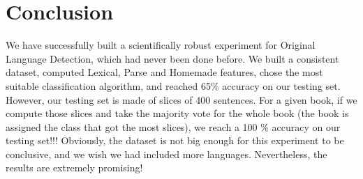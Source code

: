\documentclass[10pt]{article}
\begin{document}
\section{Conclusion}
We have successfully built a scientifically robust experiment for Original Language Detection, which had never been done before. We built a consistent dataset, computed Lexical, Parse and Homemade features, chose the most suitable classification algorithm, and reached 65\% accuracy on our testing set. However, our testing set is made of slices of 400 sentences. For a given book, if we compute those slices and take the majority vote for the whole book (the book is assigned the class that got the most slices), we reach a 100 \% accuracy on our testing set!!! Obviously, the dataset is not big enough for this experiment to be conclusive, and we wish we had included more languages. Nevertheless, the results are extremely promising!



\end{document}
